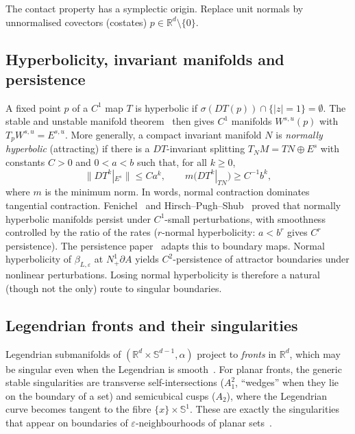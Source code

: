 \documentclass[11pt,a4paper]{article}
\theoremstyle{definition}
\theoremstyle{remark}
\newcommand{\R}{\mathbb{R}}
\newcommand{\eps}{\varepsilon}
\newcommand{\Sph}{\mathbb{S}}
\newcommand{\Nb}{N^1_+\partial A}
\begin{document}
The contact property has a symplectic origin. Replace unit normals by unnormalised covectors (costates)
$p\in\R^d\setminus\{0\}$.

\subsection{Hyperbolicity, invariant manifolds and persistence}
A fixed point $p$ of a $C^1$ map $T$ is hyperbolic if $\sigma(DT(p))\cap\{|z|=1\}=\emptyset$. The stable and unstable
manifold theorem~\cite{KH95} then gives $C^1$ manifolds $W^{s,u}(p)$ with $T_pW^{s,u}=E^{s,u}$. More generally, a compact
invariant manifold $N$ is \emph{normally hyperbolic} (attracting) if there is a $DT$-invariant splitting
$T_N M = TN\oplus E^s$ with constants $C>0$ and $0<a<b$ such that, for all $k\ge0$,
\begin{equation}\label{eq:NH}
  \|DT^k|_{E^s}\|\le C a^k,\qquad m\bigl(DT^k|_{TN}\bigr)\ge C^{-1}b^k,
\end{equation}
where $m$ is the minimum norm. In words, normal contraction dominates tangential contraction. Fenichel~\cite{Fen71} and
Hirsch--Pugh--Shub~\cite{HPS77} proved that normally hyperbolic manifolds persist under $C^1$-small perturbations, with
smoothness controlled by the ratio of the rates ($r$-normal hyperbolicity: $a<b^r$ gives $C^r$ persistence). The
persistence paper~\cite{KLRTTT23} adapts this to boundary maps. Normal hyperbolicity of $\beta_{L,\eps}$ at $\Nb$ yields
$C^2$-persistence of attractor boundaries under nonlinear perturbations. Losing normal hyperbolicity is
therefore a natural (though not the only) route to singular boundaries.

\subsection{Legendrian fronts and their singularities}
Legendrian submanifolds of $(\R^d\times\Sph^{d-1},\alpha)$ project to \emph{fronts} in $\R^d$, which may be singular even
when the Legendrian is smooth~\cite{Arn90,AGV85,Gei08}. For planar fronts, the generic stable singularities are
transverse self-intersections ($A_1^2$, ``wedges'' when they lie on the boundary of a set) and semicubical cusps ($A_2$),
where the Legendrian curve becomes tangent to the fibre $\{x\}\times\Sph^1$. These are exactly the singularities that
appear on boundaries of $\eps$-neighbourhoods of planar sets~\cite{LRTi20a,LRTi20b}.
\end{document}
